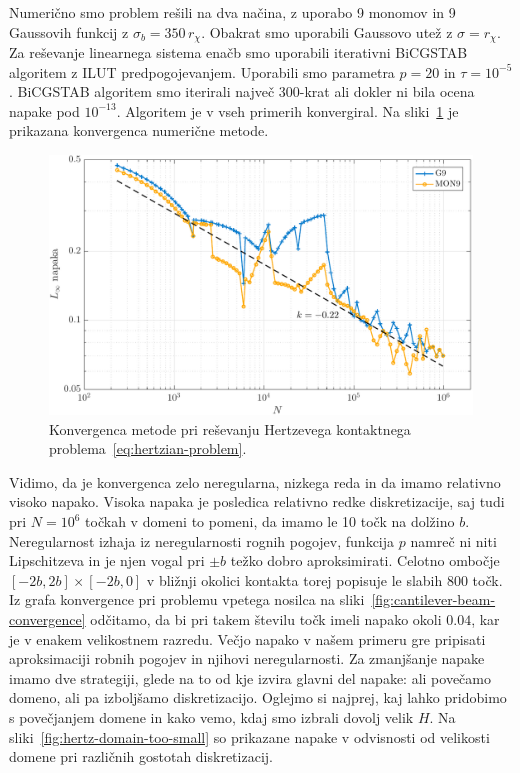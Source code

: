 \documentclass[12pt,a4paper,twoside]{article}
\theoremstyle{definition} %
\theoremstyle{plain} %
\numberwithin{equation}{section}
\newlength{\iw}
\begin{document}
Numerično smo problem rešili na dva načina, z uporabo 9 monomov in 9 Gaussovih funkcij z $\sigma_b =
350\,r_\chi$. Obakrat smo uporabili Gaussovo utež z $\sigma = r_\chi$. Za reševanje linearnega
sistema enačb smo uporabili iterativni BiCGSTAB algoritem z ILUT predpogojevanjem. Uporabili smo
parametra $p=20$ in $\tau = 10^{-5}$. BiCGSTAB algoritem smo iterirali največ 300-krat ali dokler ni
bila ocena napake pod $10^{-13}$. Algoritem je v vseh primerih konvergiral. Na
sliki~\ref{fig:hertz-convergence} je prikazana konvergenca numerične metode.

\begin{figure}[!h]
  \centering
  \includegraphics[width=\iw]{images/hertzian_convergence.pdf}
  \caption[Konvergenca metode pri reševanju Hertzevega kontaktnega
  problema.]{Konvergenca metode pri reševanju Hertzevega kontaktnega
  problema~\eqref{eq:hertzian-problem}.}
  \label{fig:hertz-convergence}
\end{figure}

Vidimo, da je konvergenca zelo neregularna, nizkega reda in da imamo relativno visoko napako.
Visoka napaka je posledica relativno redke diskretizacije, saj tudi pri $N = 10^6$ točkah v domeni
to pomeni, da imamo le 10 točk na dolžino $b$. Neregularnost izhaja iz neregularnosti rognih
pogojev, funkcija $p$ namreč ni niti Lipschitzeva in je njen vogal pri $\pm b$ težko dobro
aproksimirati. Celotno ombočje $[-2b, 2b] \times [-2b, 0]$ v bližnji okolici kontakta torej popisuje
le slabih 800 točk. Iz grafa konvergence pri problemu vpetega nosilca na
sliki~\ref{fig:cantilever-beam-convergence} odčitamo, da bi pri takem številu točk imeli napako
okoli $0.04$, kar je v enakem velikostnem razredu. Večjo napako v našem primeru gre pripisati
aproksimaciji robnih pogojev in njihovi neregularnosti. Za zmanjšanje napake imamo dve strategiji,
glede na to od kje izvira glavni del napake: ali povečamo domeno, ali pa izboljšamo diskretizacijo.
Oglejmo si najprej, kaj lahko pridobimo s povečjanjem domene in kako vemo, kdaj smo izbrali dovolj
velik $H$. Na sliki~\ref{fig:hertz-domain-too-small} so prikazane napake v odvisnosti od velikosti
domene pri različnih gostotah diskretizacij.
\end{document}
